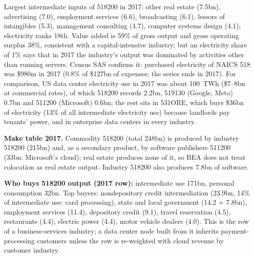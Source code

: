 \documentclass[11pt]{article}
\begin{document}
Largest intermediate inputs of 518200 in 2017: other real estate (7.5bn), advertising (7.0), employment services (6.6), broadcasting (6.1), lessors of intangibles (5.3), management consulting (4.7), computer systems design (4.1); electricity ranks 18th. Value added is 59\% of gross output and gross operating surplus 38\%, consistent with a capital-intensive industry; but an electricity share of 1\% says that in 2017 the industry's output was dominated by activities other than running servers. Census SAS confirms it: purchased electricity of NAICS 518 was \$980m in 2017 (0.8\% of \$127bn of expenses; the series ends in 2017). For comparison, US data center electricity use in 2017 was about 100~TWh (\$7--8bn at commercial rates), of which 518200 records 2.2bn, 519130 (Google, Meta) 0.7bn and 511200 (Microsoft) 0.6bn; the rest sits in 531ORE, which buys \$36bn of electricity (13\% of all intermediate electricity use) because landlords pay tenants' power, and in enterprise data centers in every industry.

\textbf{Make table 2017.} Commodity 518200 (total 248bn) is produced by industry 518200 (215bn) and, as a secondary product, by software publishers 511200 (33bn: Microsoft's cloud); real estate produces none of it, so BEA does not treat colocation as real estate output. Industry 518200 also produces 7.8bn of software.

\textbf{Who buys 518200 output (2017 row):} intermediate use 171bn, personal consumption 32bn. Top buyers: nondepository credit intermediation (23.9bn, 14\% of intermediate use: card processing), state and local government (14.2 $+$ 7.8bn), employment services (11.4), depository credit (9.1), travel reservation (4.5), restaurants (4.4), electric power (4.4), motor vehicle dealers (4.0). This is the row of a business-services industry; a data center node built from it inherits payment-processing customers unless the row is re-weighted with cloud revenue by customer industry.
\end{document}

